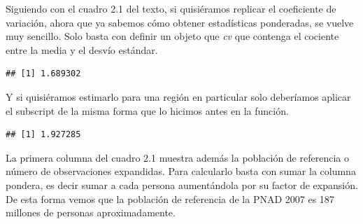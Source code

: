 \documentclass[
]{book}
\newenvironment{Shaded}{\begin{snugshade}}{\end{snugshade}}
\newcommand{\AttributeTok}[1]{\textcolor[rgb]{0.77,0.63,0.00}{#1}}
\newcommand{\DecValTok}[1]{\textcolor[rgb]{0.00,0.00,0.81}{#1}}
\newcommand{\FunctionTok}[1]{\textcolor[rgb]{0.00,0.00,0.00}{#1}}
\newcommand{\NormalTok}[1]{#1}
\newcommand{\OtherTok}[1]{\textcolor[rgb]{0.56,0.35,0.01}{#1}}
\newcommand{\SpecialCharTok}[1]{\textcolor[rgb]{0.00,0.00,0.00}{#1}}
\begin{document}
Siguiendo con el cuadro 2.1 del texto, si quisiéramos replicar el coeficiente de variación, ahora que ya sabemos cómo obtener estadísticas ponderadas, se vuelve muy sencillo. Solo basta con definir un objeto que \emph{cv} que contenga el cociente entre la media y el desvío estándar.

\begin{Shaded}
\end{Shaded}

\begin{verbatim}
## [1] 1.689302
\end{verbatim}

Y si quisiéramos estimarlo para una región en particular solo deberíamos aplicar el subscript de la misma forma que lo hicimos antes en la función.

\begin{Shaded}
\end{Shaded}

\begin{verbatim}
## [1] 1.927285
\end{verbatim}

La primera columna del cuadro 2.1 muestra además la población de referencia o número de observaciones expandidas. Para calcularlo basta con sumar la columna pondera, es decir sumar a cada persona aumentándola por su factor de expansión. De esta forma vemos que la población de referencia de la PNAD 2007 es 187 millones de personas aproximadamente.
\end{document}
